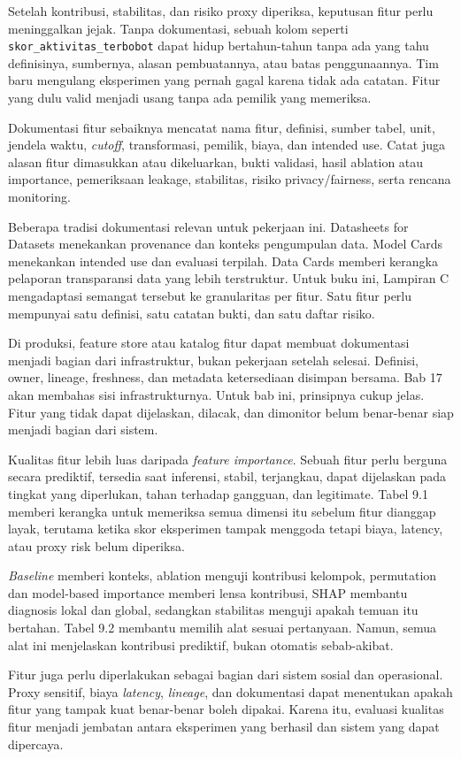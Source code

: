 Setelah kontribusi, stabilitas, dan risiko proxy diperiksa, keputusan fitur perlu meninggalkan jejak. Tanpa dokumentasi, sebuah kolom seperti \passthrough{\lstinline!skor_aktivitas_terbobot!} dapat hidup bertahun-tahun tanpa ada yang tahu definisinya, sumbernya, alasan pembuatannya, atau batas penggunaannya. Tim baru mengulang eksperimen yang pernah gagal karena tidak ada catatan. Fitur yang dulu valid menjadi usang tanpa ada pemilik yang memeriksa.

Dokumentasi fitur sebaiknya mencatat nama fitur, definisi, sumber tabel, unit, jendela waktu, \emph{cutoff}, transformasi, pemilik, biaya, dan intended use. Catat juga alasan fitur dimasukkan atau dikeluarkan, bukti validasi, hasil ablation atau importance, pemeriksaan leakage, stabilitas, risiko privacy/fairness, serta rencana monitoring.

Beberapa tradisi dokumentasi relevan untuk pekerjaan ini. Datasheets for Datasets menekankan provenance dan konteks pengumpulan data. Model Cards menekankan intended use dan evaluasi terpilah. Data Cards memberi kerangka pelaporan transparansi data yang lebih terstruktur. Untuk buku ini, Lampiran C mengadaptasi semangat tersebut ke granularitas per fitur. Satu fitur perlu mempunyai satu definisi, satu catatan bukti, dan satu daftar risiko.

Di produksi, feature store atau katalog fitur dapat membuat dokumentasi menjadi bagian dari infrastruktur, bukan pekerjaan setelah selesai. Definisi, owner, lineage, freshness, dan metadata ketersediaan disimpan bersama. Bab 17 akan membahas sisi infrastrukturnya. Untuk bab ini, prinsipnya cukup jelas. Fitur yang tidak dapat dijelaskan, dilacak, dan dimonitor belum benar-benar siap menjadi bagian dari sistem.

\begin{sintesis}

Kualitas fitur lebih luas daripada \emph{feature importance}. Sebuah fitur perlu berguna secara prediktif, tersedia saat inferensi, stabil, terjangkau, dapat dijelaskan pada tingkat yang diperlukan, tahan terhadap gangguan, dan legitimate. Tabel 9.1 memberi kerangka untuk memeriksa semua dimensi itu sebelum fitur dianggap layak, terutama ketika skor eksperimen tampak menggoda tetapi biaya, latency, atau proxy risk belum diperiksa.

\emph{Baseline} memberi konteks, ablation menguji kontribusi kelompok, permutation dan model-based importance memberi lensa kontribusi, SHAP membantu diagnosis lokal dan global, sedangkan stabilitas menguji apakah temuan itu bertahan. Tabel 9.2 membantu memilih alat sesuai pertanyaan. Namun, semua alat ini menjelaskan kontribusi prediktif, bukan otomatis sebab-akibat.

Fitur juga perlu diperlakukan sebagai bagian dari sistem sosial dan operasional. Proxy sensitif, biaya \emph{latency}, \emph{lineage}, dan dokumentasi dapat menentukan apakah fitur yang tampak kuat benar-benar boleh dipakai. Karena itu, evaluasi kualitas fitur menjadi jembatan antara eksperimen yang berhasil dan sistem yang dapat dipercaya.

\end{sintesis}

